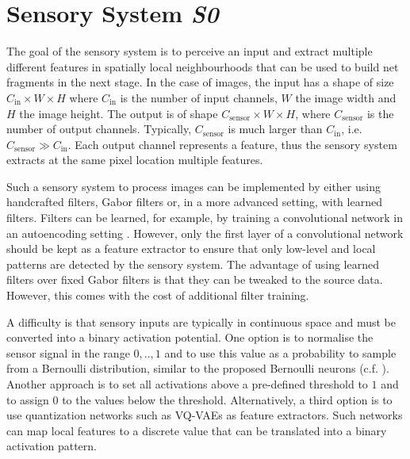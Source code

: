 \section{Sensory System \emph{S0}}
The goal of the sensory system is to perceive an input and extract multiple different features in spatially local neighbourhoods that can be used to build net fragments in the next stage.
In the case of images, the input has a shape of size $C_{\text{in}} \times W \times H$ where $C_{\text{in}}$ is the number of input channels, $W$ the image width and $H$ the image height.
The output is of shape $C_{\text{sensor}} \times W \times H$, where $C_{\text{sensor}}$ is the number of output channels. Typically, $C_{\text{sensor}}$ is much larger than $C_{\text{in}}$, i.e. $C_{\text{sensor}} \gg C_{\text{in}}$.
Each output channel represents a feature, thus the sensory system extracts at the same pixel location multiple features.

Such a sensory system to process images can be implemented by either using handcrafted filters, Gabor filters  or, in a more advanced setting, with learned filters.
Filters can be learned, for example, by training a convolutional network in an autoencoding setting . However, only the first layer of a convolutional network should be kept as a feature extractor to ensure that only low-level and local patterns are detected by the sensory system. The advantage of using learned filters over fixed Gabor filters is that they can be tweaked to the source data. However, this comes with the cost of additional filter training.

A difficulty is that sensory inputs are typically in continuous space and must be converted into a binary activation potential.
One option is to normalise the sensor signal in the range $0, .., 1$ and to use this value as a probability to sample from a Bernoulli distribution, similar to the proposed Bernoulli neurons (c.f. ).
Another approach is to set all activations above a pre-defined threshold to $1$ and to assign 0 to the values below the threshold.
Alternatively, a third option is to use quantization networks such as VQ-VAEs  as feature extractors. Such networks can map local features to a discrete value that can be translated into a binary activation pattern.




















